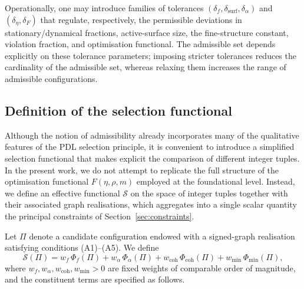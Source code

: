 \documentclass[11pt,a4paper]{article}
\begin{document}
Operationally, one may introduce families of tolerances $(\delta_f,\delta_{\mathrm{surf}},\delta_{\alpha})$ and $(\delta_{\eta},\delta_{F})$ that regulate, respectively, the permissible deviations in stationary/dynamical fractions, active-surface size, the fine-structure constant, violation fraction, and optimisation functional. The admissible set depends explicitly on these tolerance parameters; imposing stricter tolerances reduces the cardinality of the admissible set, whereas relaxing them increases the range of admissible configurations.

\subsection{Definition of the selection functional}

Although the notion of admissibility already incorporates many of the qualitative features of the PDL selection principle, it is convenient to introduce a simplified selection functional that makes explicit the comparison of different integer tuples. In the present work, we do not attempt to replicate the full structure of the optimisation functional $F(\eta,\rho,m)$ employed at the foundational level.\cite{LaubscherIntroPDL2026,LaubscherPDLFull2026} Instead, we define an effective functional $\mathcal{S}$ on the space of integer tuples together with their associated graph realisations, which aggregates into a single scalar quantity the principal constraints of Section~\ref{sec:constraints}.

Let $\Pi$ denote a candidate configuration endowed with a signed-graph realisation satisfying conditions (A1)–(A5). We define
\begin{equation}
\mathcal{S}(\Pi) = w_f\,\Phi_f(\Pi) + w_{\alpha}\,\Phi_{\alpha}(\Pi) + w_{\mathrm{coh}}\,\Phi_{\mathrm{coh}}(\Pi) + w_{\mathrm{min}}\,\Phi_{\mathrm{min}}(\Pi),
\end{equation}
where $w_f,w_{\alpha},w_{\mathrm{coh}},w_{\mathrm{min}}>0$ are fixed weights of comparable order of magnitude, and the constituent terms are specified as follows.
\end{document}
